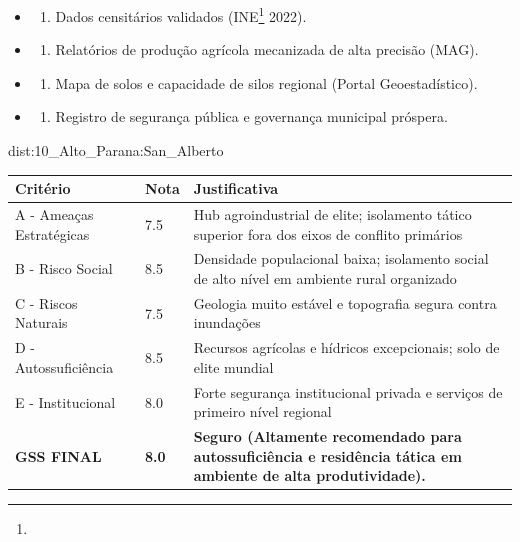 {\begin{itemize}
\tightlist
\item
  \begin{enumerate}
  \def\labelenumi{\arabic{enumi})}
  \tightlist
  \item
    Dados censitários validados (INE\footnote{\fineINE} 2022).
  \end{enumerate}
\item
  \begin{enumerate}
  \def\labelenumi{\arabic{enumi})}
  \setcounter{enumi}{1}
  \tightlist
  \item
    Relatórios de produção agrícola mecanizada de alta precisão (MAG).
  \end{enumerate}
\item
  \begin{enumerate}
  \def\labelenumi{\arabic{enumi})}
  \setcounter{enumi}{2}
  \tightlist
  \item
    Mapa de solos e capacidade de silos regional (Portal
    Geoestadístico).
  \end{enumerate}
\item
  \begin{enumerate}
  \def\labelenumi{\arabic{enumi})}
  \setcounter{enumi}{3}
  \tightlist
  \item
    Registro de segurança pública e governança municipal próspera.
  \end{enumerate}
\end{itemize}}{dist:10_Alto_Parana:San_Alberto}
\begin{table}[ht!]
\small \begin{tabular}{p{3.0cm}p{0.8cm}p{6.0cm}} \toprule
\textbf{Critério} & \textbf{Nota} & \textbf{Justificativa} \\ \midrule
A - Ameaças Estratégicas & 7.5 & Hub agroindustrial de elite; isolamento tático superior fora dos eixos de conflito primários \\
B - Risco Social & 8.5 & Densidade populacional baixa; isolamento social de alto nível em ambiente rural organizado \\
C - Riscos Naturais & 7.5 & Geologia muito estável e topografia segura contra inundações \\
D - Autossuficiência & 8.5 & Recursos agrícolas e hídricos excepcionais; solo de elite mundial \\
E - Institucional & 8.0 & Forte segurança institucional privada e serviços de primeiro nível regional \\
\midrule \textbf{GSS FINAL} & \textbf{8.0} & \textbf{Seguro (Altamente recomendado para autossuficiência e residência tática em ambiente de alta produtividade).} \\ \bottomrule \end{tabular}
\end{table}
